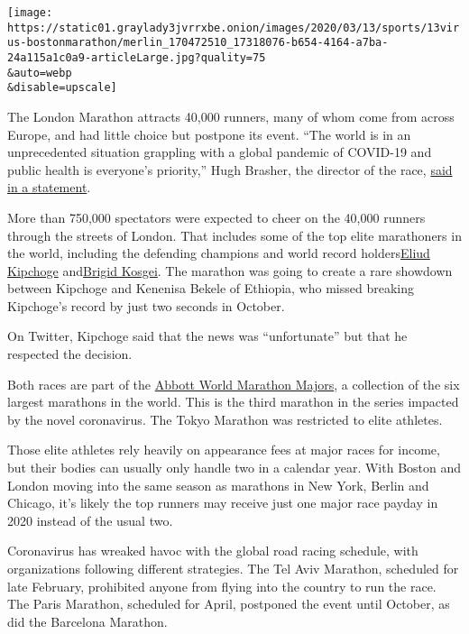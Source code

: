 \texttt{[image: https://static01.graylady3jvrrxbe.onion/images/2020/03/13/sports/13virus-bostonmarathon/merlin\_170472510\_17318076-b654-4164-a7ba-24a115a1c0a9-articleLarge.jpg?quality=75\\\&auto=webp\\\&disable=upscale]}

The London Marathon attracts 40,000 runners, many of whom come from
across Europe, and had little choice but postpone its event. ``The world
is in an unprecedented situation grappling with a global pandemic of
COVID-19 and public health is everyone's priority,'' Hugh Brasher, the
director of the race,
\href{https://www.virginmoneylondonmarathon.com/en-gb/news-media/latest-news/item/2020-virgin-money-london-marathon-postponed-to-sunday-4-october/}{said
in a statement}.

More than 750,000 spectators were expected to cheer on the 40,000
runners through the streets of London. That includes some of the top
elite marathoners in the world, including the defending champions and
world record
holders\href{https://www.nytimes3xbfgragh.onion/2019/10/12/sports/eliud-kipchoge-marathon-record.html}{Eliud
Kipchoge}
and\href{https://www.nytimes3xbfgragh.onion/2019/10/13/sports/marathon-world-record.html}{Brigid
Kosgei}. The marathon was going to create a rare showdown between
Kipchoge and Kenenisa Bekele of Ethiopia, who missed breaking Kipchoge's
record by just two seconds in October.

On Twitter, Kipchoge said that the news was ``unfortunate'' but that he
respected the decision.

Both races are part of the
\href{https://www.worldmarathonmajors.com/}{Abbott World Marathon
Majors}, a collection of the six largest marathons in the world. This is
the third marathon in the series impacted by the novel coronavirus. The
Tokyo Marathon was restricted to elite athletes.

Those elite athletes rely heavily on appearance fees at major races for
income, but their bodies can usually only handle two in a calendar year.
With Boston and London moving into the same season as marathons in New
York, Berlin and Chicago, it's likely the top runners may receive just
one major race payday in 2020 instead of the usual two.

Coronavirus has wreaked havoc with the global road racing schedule, with
organizations following different strategies. The Tel Aviv Marathon,
scheduled for late February, prohibited anyone from flying into the
country to run the race. The Paris Marathon, scheduled for April,
postponed the event until October, as did the Barcelona Marathon.

